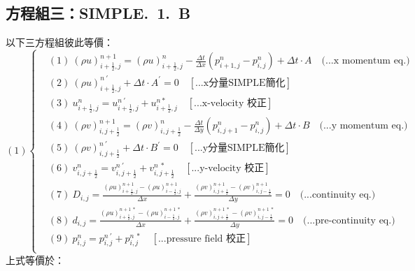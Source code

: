\documentclass[12pt]{article}
\begin{document}
\subsection{方程組三：SIMPLE.\ 1.\ B}
\label{1.B.s}
\noindent 以下三方程組彼此等價：\\
\begin{equation}
(1)
\left\{
\begin{aligned}
    &(1)\ (\rho u)_{i+\frac{1}{2},j}^{n+1} = (\rho u)_{i+\frac{1}{2},j}^{n} - \frac{\Delta t}{\Delta x}(p_{i+1,j}^{n} - p_{i,j}^{n}) + \Delta t \cdot A  \quad \text{(...x momentum eq.)}\\[1.5ex]
    &(2)\ (\rho u)_{i+\frac{1}{2},j}^{n\ \prime} + \Delta t \cdot A^{\prime} = 0\quad \left[\text{...x分量SIMPLE簡化}\right]\\[1.5ex]
    &(3)\ u_{i+\frac{1}{2},j}^{n} = u_{i+\frac{1}{2},j}^{n\ '} + u_{i+\frac{1}{2},j}^{n *}  \quad \left[\text{...x-velocity 校正}\right]\\[1.5ex]
    &(4)\ (\rho v)_{i,j+\frac{1}{2}}^{n+1} = (\rho v)_{i,j+\frac{1}{2}}^{n} - \frac{\Delta t}{\Delta y}(p_{i,j+1}^{n} - p_{i,j}^{n}) + \Delta t \cdot B  \quad \text{(...y momentum eq.)}\\[1.5ex]
    &(5)\ (\rho v)_{i,j+\frac{1}{2}}^{n\ \prime} + \Delta t \cdot B^{\prime} = 0 \quad\left[\text{...y分量SIMPLE簡化}\right]\\[1.5ex]
    &(6)\ v_{i,j+\frac{1}{2}}^{n} = v_{i,j+\frac{1}{2}}^{n\ \prime} + v_{i,j+\frac{1}{2}}^{n\ *} \quad \left[\text{...y-velocity 校正}\right]\\[1.5ex]
    &(7)\ D_{i,j} = \frac{(\rho u)_{i+\frac{1}{2},j}^{n+1} - (\rho u)_{i-\frac{1}{2},j}^{n+1}}{\Delta x} + \frac{(\rho v)_{i,j+\frac{1}{2}}^{n+1} - (\rho v)_{i,j-\frac{1}{2}}^{n+1}}{\Delta y} = 0 \quad \text{(...continuity eq.)}\\[1.5ex]
    &(8)\ d_{i,j} = \frac{(\rho u)_{i+\frac{1}{2},j}^{n+1\ *} - (\rho u)_{i-\frac{1}{2},j}^{n+1\ *}}{\Delta x} + \frac{(\rho v)_{i,j+\frac{1}{2}}^{n+1\ *} - (\rho v)_{i,j-\frac{1}{2}}^{n+1\ *}}{\Delta y} = 0 \quad \text{(...pre-continuity eq.)}\\[1.5ex]
    &(9)\ p_{i,j}^{n} = p_{i,j}^{n\ \prime} + p_{i,j}^{n\ *} \quad\left[\text{...pressure field 校正}\right]\\[1.5ex]
\end{aligned}
\right.
\end{equation}
\noindent 上式等價於：\\
\end{document}
